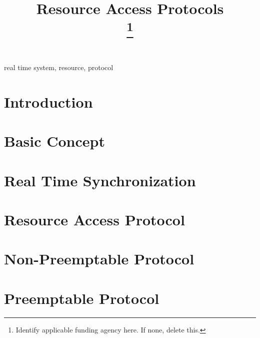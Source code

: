 \documentclass[conference]{IEEEtran}
\begin{document}
\title{Resource Access Protocols\\
{\footnotesize }
\thanks{Identify applicable funding agency here. If none, delete this.}
}

\author{

}

\maketitle



\begin{IEEEkeywords}
real time system, resource, protocol 
\end{IEEEkeywords}

\section{Introduction}


\section{Basic Concept}


\section{Real Time Synchronization}


\section{Resource Access Protocol}


\section{Non-Preemptable Protocol}


\section{Preemptable Protocol}

\end{document}
